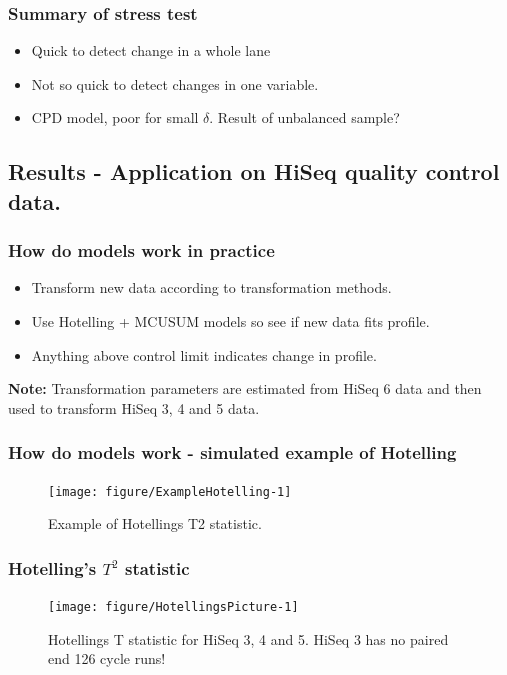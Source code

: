 \documentclass[10pt]{beamer}\usepackage[]{graphicx}\usepackage[]{color}
\newenvironment{knitrout}{}{} %
\begin{document}
\begin{frame}\frametitle{Summary of stress test}
\begin{itemize}
\item Quick to detect change in a whole lane
\item Not so quick to detect changes in one variable. 
\item CPD model, poor for small $\delta$. Result of unbalanced sample?
\end{itemize}
\end{frame}

\subsection{Results - Application on HiSeq quality control data.}

\begin{frame}\frametitle{How do models work in practice}
\begin{itemize}
\item Transform new data according to transformation methods.
\item Use Hotelling + MCUSUM models so see if new data fits profile.
\item Anything above control limit indicates change in profile.
\end{itemize}
\textbf{Note:} Transformation parameters are estimated from HiSeq 6 data and then used to transform HiSeq 3, 4 and 5 data.
\end{frame}


\begin{frame}\frametitle{How do models work - simulated example of Hotelling}
\begin{knitrout}
\color{fgcolor}\begin{figure}
\texttt{[image: figure/ExampleHotelling-1]} \caption[Example of Hotellings T2 statistic]{Example of Hotellings T2 statistic.}\label{fig:ExampleHotelling}
\end{figure}


\end{knitrout}
\end{frame}
 
\begin{frame}\frametitle{Hotelling's $T^2$ statistic}
\begin{knitrout}
\color{fgcolor}\begin{figure}
\texttt{[image: figure/HotellingsPicture-1]} \caption[Hotellings T statistic for HiSeq 3, 4 and 5]{Hotellings T statistic for HiSeq 3, 4 and 5. HiSeq 3 has no paired end 126 cycle runs!}\label{fig:HotellingsPicture}
\end{figure}


\end{knitrout}
\end{frame}
\end{document}
